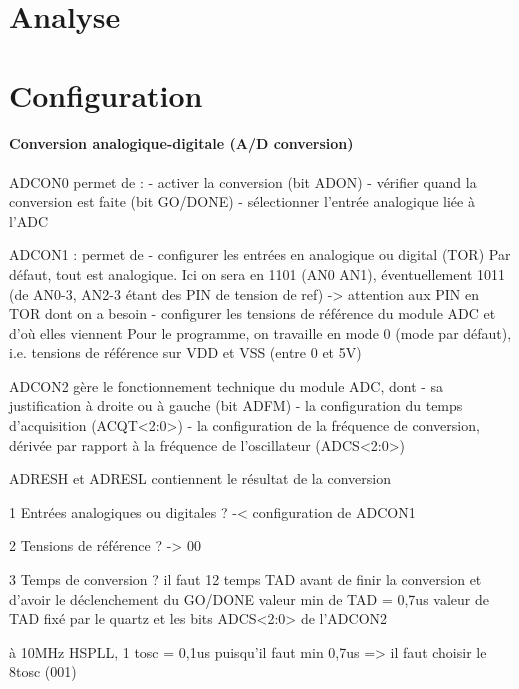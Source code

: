 \documentclass{article}
\begin{document}
    \section{Analyse}
    \paragraph{}
    

    

    \section{Configuration}
    \paragraph{Conversion analogique-digitale (A/D conversion)}
    ADCON0 permet de :
    - activer la conversion (bit ADON)
    - vérifier quand la conversion est faite (bit GO/DONE)
    - sélectionner l'entrée analogique liée à l'ADC

    ADCON1 :
    permet de
    - configurer les entrées en analogique ou digital (TOR)
    Par défaut, tout est analogique. Ici on sera en 1101 (AN0 AN1), éventuellement 1011 (de AN0-3, AN2-3 étant des PIN de tension de ref) -> attention aux PIN en TOR dont on a besoin
    - configurer les tensions de référence du module ADC et d'où elles viennent
    Pour le programme, on travaille en mode 0 (mode par défaut), i.e. tensions de référence sur VDD et VSS (entre 0 et 5V)

    ADCON2
    gère le fonctionnement technique du module ADC, dont 
    - sa justification à droite ou à gauche (bit ADFM)
    - la configuration du temps d'acquisition (ACQT<2:0>)
    - la configuration de la fréquence de conversion, dérivée par rapport à la fréquence de l'oscillateur (ADCS<2:0>)

    ADRESH et ADRESL
    contiennent le résultat de la conversion


    1 Entrées analogiques ou digitales ? -< configuration de ADCON1

    2 Tensions de référence ? -> 00

    3 Temps de conversion ? il faut 12 temps TAD avant de finir la conversion et d'avoir le déclenchement du GO/DONE
    valeur min de TAD = 0,7us
    valeur de TAD fixé par le quartz et les bits ADCS<2:0> de l'ADCON2

    à 10MHz HSPLL, 1 tosc = 0,1us 
    puisqu'il faut min 0,7us => il faut choisir le 8tosc (001)
\end{document}
